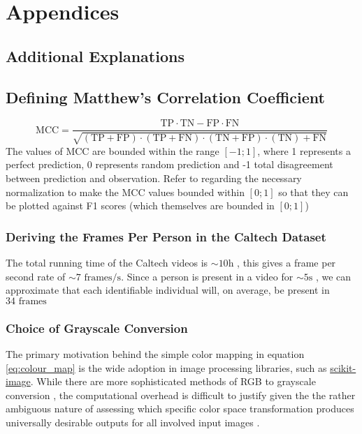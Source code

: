 \appendix
\section{Appendices}

\subsection{Additional Explanations}

\subsection{Defining Matthew's Correlation Coefficient}\label{appendix:matthews_correlation}
$$\mathrm{MCC} = \frac{\mathrm{TP}\cdot\mathrm{TN}-\mathrm{FP}\cdot\mathrm{FN}}{\sqrt{(\mathrm{TP}+\mathrm{FP})\cdot(\mathrm{TP}+\mathrm{FN})\cdot(\mathrm{TN}+\mathrm{FP})\cdot(\mathrm{TN})+\mathrm{FN}}}$$ 
The values of MCC are bounded within the range $[-1;1]$, where 1 represents a perfect prediction, 0 represents random prediction and -1 total disagreement between prediction and observation. Refer to \cite{chicco_jurman_2020_mcc_f1} regarding the necessary normalization to make the MCC values bounded within $[0;1]$ so that they can be plotted against F1 scores (which themselves are bounded in $[0;1]$)

\subsubsection{Deriving the Frames Per Person in the Caltech Dataset}\label{appendix:caltech_frames_per_person}
The total running time of the Caltech videos is $\sim 10\mathrm{h}$ \cite{dollar_2009_pedestrian}, this gives a frame per second rate of $\sim 7 \text{ frames}/\mathrm{s}$. Since a person is present in a video for $\sim 5 \mathrm{s}$ \cite{dollar_2009_pedestrian}, we can approximate that each identifiable individual will, on average, be present in $34 \text{ frames}$
\subsubsection{Choice of Grayscale Conversion}\label{appendix:grayscale_discuss}
The primary motivation behind the simple color mapping in equation \ref{eq:colour_map} is the wide adoption in image processing libraries, such as \href{https://scikit-image.org/}{scikit-image}. While there are more sophisticated methods of RGB to grayscale conversion \cite{madk_2008_perceptual}, the computational overhead is difficult to justify given the the rather ambiguous nature of assessing which specific color space transformation produces universally desirable outputs for all involved input images \cite{madk_2008_perceptual}.

